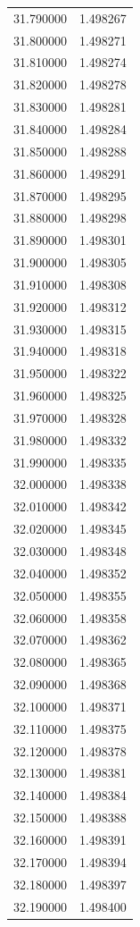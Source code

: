 \begin{tabular}{rr}
31.790000 & 1.498267 \\
31.800000 & 1.498271 \\
31.810000 & 1.498274 \\
31.820000 & 1.498278 \\
31.830000 & 1.498281 \\
31.840000 & 1.498284 \\
31.850000 & 1.498288 \\
31.860000 & 1.498291 \\
31.870000 & 1.498295 \\
31.880000 & 1.498298 \\
31.890000 & 1.498301 \\
31.900000 & 1.498305 \\
31.910000 & 1.498308 \\
31.920000 & 1.498312 \\
31.930000 & 1.498315 \\
31.940000 & 1.498318 \\
31.950000 & 1.498322 \\
31.960000 & 1.498325 \\
31.970000 & 1.498328 \\
31.980000 & 1.498332 \\
31.990000 & 1.498335 \\
32.000000 & 1.498338 \\
32.010000 & 1.498342 \\
32.020000 & 1.498345 \\
32.030000 & 1.498348 \\
32.040000 & 1.498352 \\
32.050000 & 1.498355 \\
32.060000 & 1.498358 \\
32.070000 & 1.498362 \\
32.080000 & 1.498365 \\
32.090000 & 1.498368 \\
32.100000 & 1.498371 \\
32.110000 & 1.498375 \\
32.120000 & 1.498378 \\
32.130000 & 1.498381 \\
32.140000 & 1.498384 \\
32.150000 & 1.498388 \\
32.160000 & 1.498391 \\
32.170000 & 1.498394 \\
32.180000 & 1.498397 \\
32.190000 & 1.498400 \\

\end{tabular}
